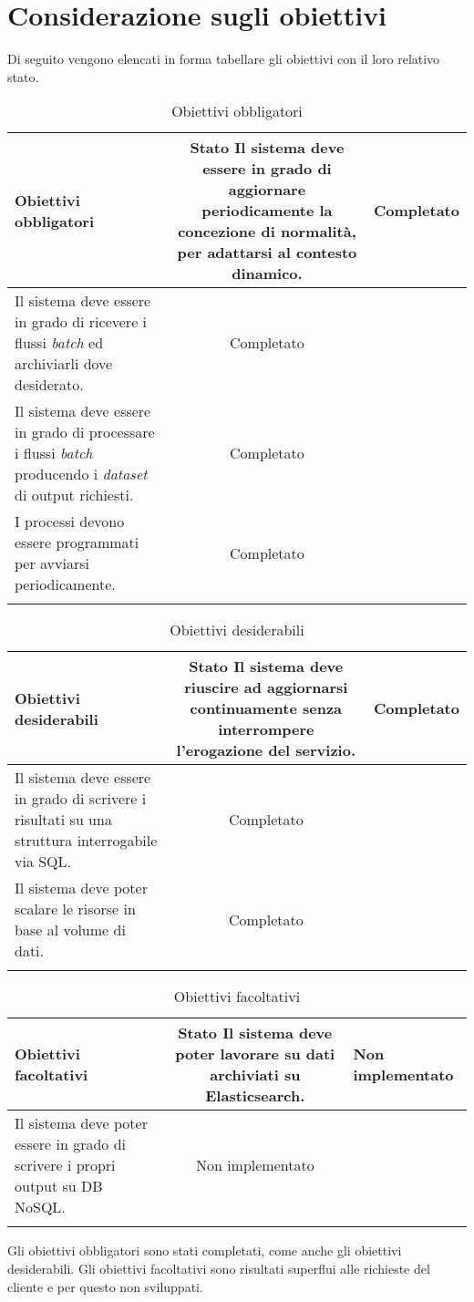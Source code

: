 \section{Considerazione sugli obiettivi}
Di seguito vengono elencati in forma tabellare gli obiettivi con il loro relativo stato.
\normalsize
\renewcommand{\arraystretch}{1.5}
\begin{longtable}{|K|c|}
	\hline
	\textbf{Obiettivi obbligatori} &
	\textbf{Stato} 
	\endhead
	\hline
	Il sistema deve essere in grado di aggiornare periodicamente la concezione di normalità, per adattarsi al contesto dinamico. & Completato  \\ \hline 	 
	Il sistema deve essere in grado di ricevere i flussi \emph{batch} ed archiviarli dove desiderato. & Completato  \\ \hline 	 
	Il sistema deve essere in grado di processare i flussi \emph{batch} producendo i \emph{dataset} di output richiesti. & Completato  \\ \hline 	 
	I processi devono essere programmati per avviarsi periodicamente. & Completato  \\ \hline 	 
	\caption[Tabella degli obiettivi obbligatori]{Obiettivi obbligatori}
	\label{tabella:obiettiviO}
\end{longtable}
\renewcommand{\arraystretch}{1}
\normalsize
\renewcommand{\arraystretch}{1.5}
\begin{longtable}{|K|c|}
	\hline
	\textbf{Obiettivi desiderabili} &
	\textbf{Stato} 
	\endhead
	\hline
	Il sistema deve riuscire ad aggiornarsi continuamente senza interrompere l'erogazione del servizio. & Completato  \\ \hline 	 
	Il sistema deve essere in grado di scrivere i risultati su una struttura interrogabile via SQL. & Completato  \\ \hline 	 
	Il sistema deve poter scalare le risorse in base al volume di dati. & Completato  \\ \hline 	 
		\caption[Tabella degli obiettivi desiderabili]{Obiettivi desiderabili}
	\label{tabella:obiettiviD}
\end{longtable}
\renewcommand{\arraystretch}{1}
\normalsize
\renewcommand{\arraystretch}{1.5}
\begin{longtable}{|K|c|}
	\hline
	\textbf{Obiettivi facoltativi} &
	\textbf{Stato} 
	\endhead
	\hline
	Il sistema deve poter lavorare su dati archiviati su Elasticsearch. & Non implementato  \\ \hline 	 
	Il sistema deve poter essere in grado di scrivere i propri output su DB NoSQL. & Non implementato  \\ \hline 	 
	\caption[Tabella degli obiettivi facoltativi]{Obiettivi facoltativi}
	\label{tabella:obiettiviF}
\end{longtable}
\renewcommand{\arraystretch}{1}
Gli obiettivi obbligatori sono stati completati, come anche gli obiettivi desiderabili.
Gli obiettivi facoltativi sono risultati superflui alle richieste del cliente e per questo non sviluppati.

